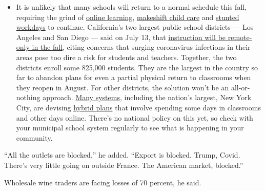 \begin{itemize}
  \begin{itemize}
  \tightlist
  \item
    It is unlikely that many schools will return to a normal schedule
    this fall, requiring the grind of
    \href{https://www.nytimes.com/2020/06/05/us/coronavirus-education-lost-learning.html?action=click\&pgtype=Article\&state=default\&region=MAIN_CONTENT_3\&context=storylines_faq}{online
    learning},
    \href{https://www.nytimes.com/2020/05/29/us/coronavirus-child-care-centers.html?action=click\&pgtype=Article\&state=default\&region=MAIN_CONTENT_3\&context=storylines_faq}{makeshift
    child care} and
    \href{https://www.nytimes.com/2020/06/03/business/economy/coronavirus-working-women.html?action=click\&pgtype=Article\&state=default\&region=MAIN_CONTENT_3\&context=storylines_faq}{stunted
    workdays} to continue. California's two largest public school
    districts --- Los Angeles and San Diego --- said on July 13, that
    \href{https://www.nytimes.com/2020/07/13/us/lausd-san-diego-school-reopening.html?action=click\&pgtype=Article\&state=default\&region=MAIN_CONTENT_3\&context=storylines_faq}{instruction
    will be remote-only in the fall}, citing concerns that surging
    coronavirus infections in their areas pose too dire a risk for
    students and teachers. Together, the two districts enroll some
    825,000 students. They are the largest in the country so far to
    abandon plans for even a partial physical return to classrooms when
    they reopen in August. For other districts, the solution won't be an
    all-or-nothing approach.
    \href{https://bioethics.jhu.edu/research-and-outreach/projects/eschool-initiative/school-policy-tracker/}{Many
    systems}, including the nation's largest, New York City, are
    devising
    \href{https://www.nytimes.com/2020/06/26/us/coronavirus-schools-reopen-fall.html?action=click\&pgtype=Article\&state=default\&region=MAIN_CONTENT_3\&context=storylines_faq}{hybrid
    plans} that involve spending some days in classrooms and other days
    online. There's no national policy on this yet, so check with your
    municipal school system regularly to see what is happening in your
    community.
  \end{itemize}
\end{itemize}

``All the outlets are blocked,'' he added. ``Export is blocked. Trump,
Covid. There's very little going on outside France. The American market,
blocked.''

Wholesale wine traders are facing losses of 70 percent, he said.


